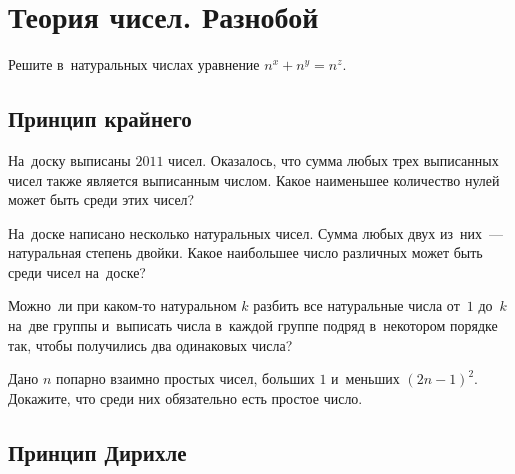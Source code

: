 
\section*{Теория чисел. Разнобой}


\begin{problems}

\item
Решите в~натуральных числах уравнение $n^{x} + n^{y} = n^{z}$.

\end{problems}

\subsection*{Принцип крайнего}

\begin{problems}

\item
На~доску выписаны $2011$ чисел.
Оказалось, что сумма любых трех выписанных чисел также является выписанным
числом.
Какое наименьшее количество нулей может быть среди этих чисел?

\item
На~доске написано несколько натуральных чисел.
Сумма любых двух из~них~--- натуральная степень двойки.
Какое наибольшее число различных может быть среди чисел на~доске?

\item
Можно~ли при каком-то натуральном $k$ разбить все натуральные числа
от~$1$ до~$k$ на~две группы и~выписать числа в~каждой группе подряд в~некотором
порядке так, чтобы получились два одинаковых числа?

\item
Дано $n$ попарно взаимно простых чисел, больших $1$ и~меньших $(2 n - 1)^{2}$.
Докажите, что среди них обязательно есть простое число.

\end{problems}


\subsection*{Принцип Дирихле}

